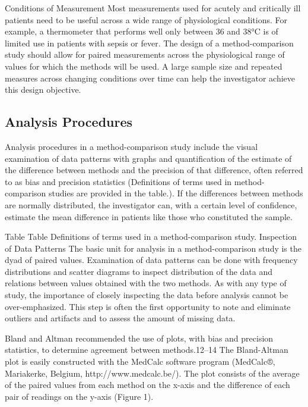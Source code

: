 \documentclass[]{article}
\begin{document}
Conditions of Measurement
Most measurements used for acutely and critically ill patients need to be useful across a wide range of physiological conditions. For example, a thermometer that performs well only between 36 and 38°C is of limited use in patients with sepsis or fever. The design of a method-comparison study should allow for paired measurements across the physiological range of values for which the methods will be used. A large sample size and repeated measures across changing conditions over time can help the investigator achieve this design objective.

\subsection*{Analysis Procedures}

Analysis procedures in a method-comparison study include the visual examination of data patterns with graphs and quantification of the estimate of the difference between methods and the precision of that difference, often referred to as bias and precision statistics (Definitions of terms used in method-comparison studies are provided in the table.). If the differences between methods are normally distributed, the investigator can, with a certain level of confidence, estimate the mean difference in patients like those who constituted the sample.

Table
Table
Definitions of terms used in a method-comparison study.
Inspection of Data Patterns
The basic unit for analysis in a method-comparison study is the dyad of paired values. Examination of data patterns can be done with frequency distributions and scatter diagrams to inspect distribution of the data and relations between values obtained with the two methods. As with any type of study, the importance of closely inspecting the data before analysis cannot be over-emphasized. This step is often the first opportunity to note and eliminate outliers and artifacts and to assess the amount of missing data.

Bland and Altman recommended the use of plots, with bias and precision statistics, to determine agreement between methods.12–14 The Bland-Altman plot is easily constructed with the MedCalc software program (MedCalc®, Mariakerke, Belgium, http://www.medcalc.be/). The plot consists of the average of the paired values from each method on the x-axis and the difference of each pair of readings on the y-axis (Figure 1).
\end{document}
